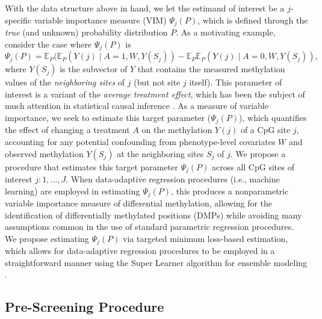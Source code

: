 \documentclass[9pt,a4paper,]{extarticle}
\theoremstyle{definition}
\theoremstyle{definition}
\theoremstyle{definition}
\theoremstyle{remark}
\begin{document}
With the data structure above in hand, we let the estimand of interest be a
\(j\)-specific variable importance measure (VIM) \(\Psi_j(P)\), which is defined
through the \emph{true} (and unknown) probability distribution \(P\). As a motivating
example, consider the case where \(\Psi_j(P)\) is
\begin{equation}\label{vim_param}
  \Psi_j(P) = \mathbb{E}_P(\mathbb{E}_P(Y(j) \mid A = 1, W, Y(S_j)) -
    \mathbb{E}_P \mathbb{E}_P(Y(j) \mid A = 0, W, Y(S_j)),
\end{equation}
where \(Y(S_j)\) is the subvector of \(Y\) that contains the measured methylation
values of the \emph{neighboring sites} of \(j\) (but not site \(j\) itself). This
parameter of interest is a variant of the \emph{average treatment effect}, which has
been the subject of much attention in statistical causal inference
\citep[\citet{hahn1998role}, \citet{hirano2003efficient}]{holland1986statistics}. As a measure of
variable importance, we seek to estimate this target parameter (\(\Psi_j(P)\)),
which quantifies the effect of changing a treatment \(A\) on the methylation
\(Y(j)\) of a CpG site \(j\), accounting for any potential confounding from
phenotype-level covariates \(W\) and observed methylation \(Y(S_j)\) at the
neighboring sites \(S_j\) of \(j\). We propose a procedure that estimates this
target parameter \(\Psi_j(P)\) across all CpG sites of interest \(j: 1, \ldots, J\).
When data-adaptive regression procedures (i.e., machine learning) are employed
in estimating \(\Psi_j(P)\), this produces a nonparametric variable importance
measure of differential methylation, allowing for the identification of
differentially methylated positions (DMPs) while avoiding many assumptions
common in the use of standard parametric regression procedures. We propose
estimating \(\Psi_j(P)\) via targeted minimum loss-based estimation, which allows
for data-adaptive regression procedures to be employed in a straightforward
manner using the Super Learner algorithm for ensemble modeling \citep[
\citet{wolpert1992stacked}, \citet{breiman1996stacked}, \citet{gruber2009targeted},
\citet{vdl2011targeted}]{vdl2007super}.

\hypertarget{pre-screening-procedure}{%
\subsection{Pre-Screening Procedure}\label{pre-screening-procedure}}
\end{document}
